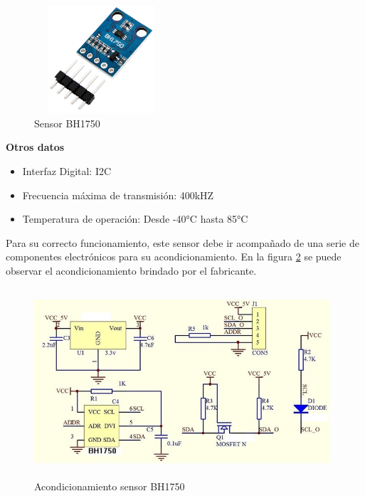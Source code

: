 \begin{figure}[H]
    \centering
    \includegraphics[width=5cm, height=4cm]{imagenes/Sensor BH1750.jpg}
    \caption{Sensor BH1750}
    \label{imag:BH1750}
 \end{figure}

\textbf{Otros datos}

\begin{itemize}
    \item Interfaz Digital: I2C
    \item Frecuencia máxima de transmisión: 400kHZ
    \item Temperatura de operación: Desde -40°C hasta 85°C
\end{itemize}

Para su correcto funcionamiento, este sensor debe ir acompañado de una serie de componentes electrónicos para su acondicionamiento.
En la figura \ref{imag:acondicionamiento_BH1750} se puede observar el acondicionamiento brindado por el fabricante.

\begin{figure}[H]
    \centering
    \includegraphics[width=11cm, height=7cm]{imagenes/acondicionamientos sensor BH1750.jpg}
    \caption{Acondicionamiento sensor BH1750}
    \label{imag:acondicionamiento_BH1750}
\end{figure}

\vspace{1cm}

